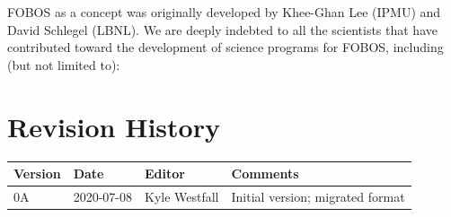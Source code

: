 \documentclass[11pt,a4paper,twoside,onecolumn,openany,final,oldfontcommands]{memoir}
\begin{document}
FOBOS as a concept was originally developed by Khee-Ghan Lee (IPMU) and David Schlegel (LBNL).  We are deeply indebted to all the scientists that have contributed toward the development of science programs for FOBOS, including (but not limited to): 

\newpage

\chapter*{Revision History}

\begin{table}[hp]{%
\begin{tabular}{l | l | l |  p{22pc}} \toprule
\textbf{Version} & \textbf{Date} & \textbf{Editor} & \textbf{Comments} \\ \midrule
0A & 2020-07-08 & Kyle Westfall & Initial version; migrated format \\ \bottomrule
\end{tabular}}
\end{table}



\end{document}
